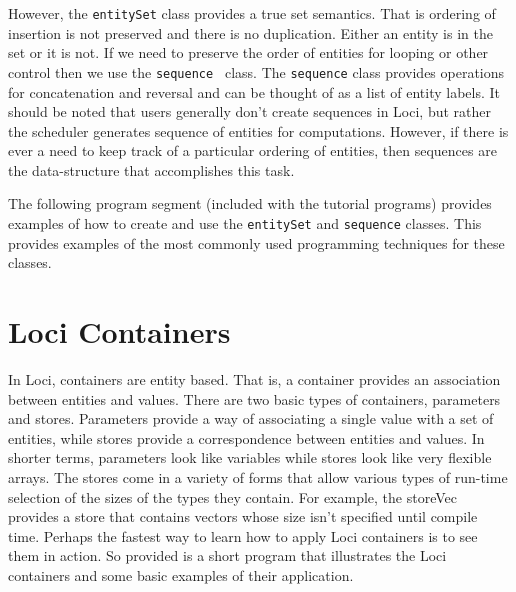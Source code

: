 \documentclass[10pt,epsf]{book}
\begin{document}
However, the {\tt entitySet} class provides a true set semantics.
That is ordering of insertion is not preserved and there is no
duplication.  Either an entity is in the set or it is not.  If we need
to preserve the order of entities for looping or other control then we
use the {\tt sequence } class.  The {\tt sequence} class provides
operations for concatenation and reversal and can be thought
of as a list of entity labels.  It should be noted that users
generally don't create sequences in Loci, but rather the scheduler
generates sequence of entities for computations.  However, if there is
ever a need to keep track of a particular ordering of entities, then
sequences are the data-structure that accomplishes this task.

The following program segment (included with the tutorial programs)
provides examples of how to create and use the {\tt  entitySet} and
{\tt sequence} classes.  This provides examples of the most commonly
used programming techniques for these classes.



\section{Loci Containers}

In Loci, containers are entity based.  That is, a container provides
an association between entities and values.  There are two basic types
of containers, parameters and stores.  Parameters provide a way of
associating a single value with a set of entities, while stores
provide a correspondence between entities and values.  In shorter
terms, parameters look like variables while stores look like very
flexible arrays.  The stores come in a variety of forms that allow
various types of run-time selection of the sizes of the types they
contain.  For example, the storeVec provides a store that contains
vectors whose size isn't specified until compile time.  Perhaps the
fastest way to learn how to apply Loci containers is to see them in
action.  So provided is a short program that illustrates the Loci
containers and some basic examples of their application.


\end{document}
